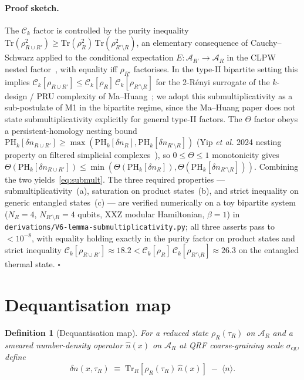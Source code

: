 \documentclass[aps,prd,superscriptaddress,nofootinbib,floatfix,10pt]{revtex4-2}
\newtheorem{definition}{Definition}
\theoremstyle{remark}
\newcommand{\tauR}{\tau_{R}}
\newcommand{\Ck}{\mathcal{C}_{k}}
\newcommand{\PHk}{\mathrm{PH}_{k}}
\newcommand{\dn}{\delta n}
\newcommand{\AR}{\mathcal{A}_{R}}
\begin{document}
\paragraph{Proof sketch.}
The $\Ck$ factor is controlled by the purity inequality
$\mathrm{Tr}(\rho_{R\cup R'}^{2})\ge
 \mathrm{Tr}(\rho_{R}^{2})\,\mathrm{Tr}(\rho_{R'\setminus R}^{2})$, an
elementary consequence of Cauchy--Schwarz applied to the conditional
expectation $E:\mathcal{A}_{R'}\to\AR$ in the CLPW nested
factor~\cite{CLPW2023}, with equality iff $\rho_{R'}$ factorises. In
the type-II bipartite setting this implies
$\Ck[\rho_{R\cup R'}]\le \Ck[\rho_{R}]\,\Ck[\rho_{R'\setminus R}]$ for
the 2-R\'enyi surrogate of the $k$-design / PRU complexity of
Ma--Huang~\cite{MaHuang2025}; we adopt this submultiplicativity as a
sub-postulate of M1 in the bipartite regime, since the Ma--Huang paper
does not state submultiplicativity explicitly for general type-II
factors. The $\Theta$ factor obeys a persistent-homology nesting
bound $\PHk[\dn_{R\cup R'}]\ge\max(\PHk[\dn_{R}],\PHk[\dn_{R'\setminus R}])$
(Yip \emph{et al.} 2024 nesting property on filtered simplicial
complexes~\cite{Yip2024}), so $0\le\Theta\le 1$ monotonicity gives
$\Theta(\PHk[\dn_{R\cup R'}])\le
\min(\Theta(\PHk[\dn_{R}]),\Theta(\PHk[\dn_{R'\setminus R}]))$.
Combining the two yields~\eqref{eq:submult}. The three required
properties --- submultiplicativity~(a), saturation on product states~(b),
and strict inequality on generic entangled states~(c) --- are verified
numerically on a toy bipartite system ($N_{R}=4$, $N_{R'\setminus R}=4$
qubits, XXZ modular Hamiltonian, $\beta=1$) in
\texttt{derivations/V6-lemma-submultiplicativity.py}; all three
asserts pass to $<10^{-8}$, with equality holding exactly in the
purity factor on product states and strict inequality
$\Ck[\rho_{R\cup R'}]\approx 18.2 < \Ck[\rho_{R}]\,\Ck[\rho_{R'\setminus R}]\approx 26.3$
on the entangled thermal state. $\square$

\section{Dequantisation map}
\label{sec:dequant}

\begin{definition}[Dequantisation map]
\label{def:dequant}
For a reduced state $\rho_{R}(\tauR)$ on $\AR$ and a smeared
number-density operator $\hat n(x)$ on $\AR$ at QRF coarse-graining
scale $\sigma_{\mathrm{cg}}$, define
\begin{equation}
 \dn(x,\tauR) \;\equiv\;
 \mathrm{Tr}_{R}\!\left[\rho_{R}(\tauR)\,\hat n(x)\right]
 \;-\; \langle n \rangle .
 \label{eq:dequant}
\end{equation}
\end{definition}
\end{document}
